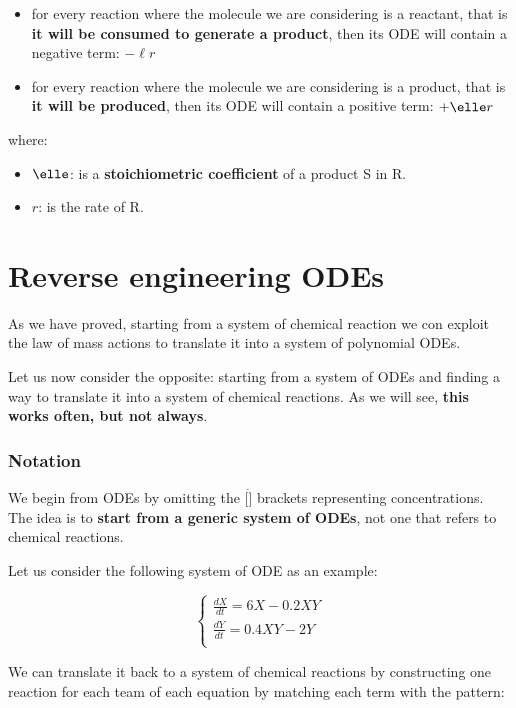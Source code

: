 \begin{itemize}
    \item for every reaction where the molecule we are considering is a reactant, that is \textbf{it will be consumed to generate a product}, then its ODE will contain a negative term: $- \ell r$

    \item for every reaction where the molecule we are considering is a product, that is \textbf{it will be produced}, then its ODE will contain a positive term: $+ \elle r$
\end{itemize}

where:
\begin{itemize}
    \item $\elle$: is a \textbf{stoichiometric coefficient} of a product S in R.
    \item $r$: is the rate of R.
\end{itemize}


\section{Reverse engineering ODEs}
As we have proved, starting from a system of chemical reaction we con exploit the law of mass actions to translate it into a system of polynomial ODEs. \par
Let us now consider the opposite: starting from a system of ODEs and finding a way to translate it into a system of chemical reactions. As we will see, \textbf{this works often, but not always}.

\subsubsection{Notation}
We begin from ODEs by omitting the $[\dot]$ brackets representing concentrations. The idea is to \textbf{start from a generic system of ODEs}, not one that refers to chemical reactions.

Let us consider the following system of ODE as an example:

\[
\begin{cases}
        \frac{dX}{dt} = 6 X - 0.2 X Y \\
        \frac{dY}{dt} = 0.4 X Y - 2 Y\\
\end{cases}
\]

We can translate it back to a system of chemical reactions by constructing one reaction for each team of each equation by matching each term with the pattern:

